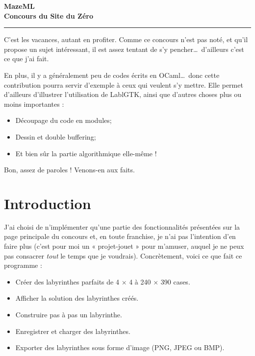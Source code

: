 \documentclass[11pt]{article}
\begin{document}
  \sffamily

  \begin{center}
    \bfseries
      \Huge{MazeML}\\
      \Large{Concours du Site du Zéro}\\
      \rule{0.8\linewidth}{5\em}
    \vspace*{20\em}
  \end{center}

  \tableofcontents
  \pagebreak

  C'est les vacances, autant en profiter. Comme ce concours n'est pas noté, et 
  qu'il propose un sujet intéressant, il est assez tentant de s'y pencher\ldots\
  d'ailleurs c'est ce que j'ai fait.

  \vspace{3mm}

  En plus, il y a généralement peu de codes écrits en OCaml\ldots\ donc cette 
  contribution pourra servir d'exemple à ceux qui veulent s'y mettre. Elle 
  permet d'ailleurs d'illustrer l'utilisation de LablGTK, ainsi que d'autres 
  choses plus ou moins importantes :

  \vspace{3mm}
  \begin{itemize}
    \item Découpage du code en modules;
    \item Dessin et double buffering;
    \item Et bien sûr la partie algorithmique elle-même !
  \end{itemize}
  \vspace{3mm}

  Bon, assez de paroles ! Venons-en aux faits.


  \section{Introduction}

  J'ai choisi de n'implémenter qu'une partie des fonctionnalités présentées sur
  la page principale du concours et, en toute franchise, je n'ai pas l'intention
  d'en faire plus (c'est pour moi un « projet-jouet » pour m'amuser, auquel je 
  ne peux pas consacrer \emph{tout} le temps que je voudrais). Concrètement, 
  voici ce que fait ce programme :

  \vspace{3mm}
  \begin{itemize}
    \item Créer des labyrinthes parfaits de 4 $\times$ 4 à 240 $\times$ 390 
      cases.
    \item Afficher la solution des labyrinthes créés.
    \item Construire pas à pas un labyrinthe.
    \item Enregistrer et charger des labyrinthes.
    \item Exporter des labyrinthes sous forme d'image (PNG, JPEG ou BMP).
  \end{itemize}
\end{document}

